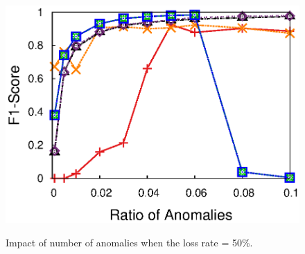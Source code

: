 {\begin{figure}[h!]
{{    \includegraphics[width=\figurewidthQ]{fig/dect.NumAnomaly.srmf_based_pred.tm_multi_loc_rssi.txt.500.895.1.500.r32.period1.org.2d.elem.ind.elem1.lr0.5.burst1.anom0.4.noise0.thresh0.eps}
  }
  }
  \vspace{-0.1in}
  \caption{Impact of number of anomalies when the loss rate = 50\%.}
  \vspace{-0.1in}
  \label{fig:anomaly-number-detection}
\end{figure}
}

